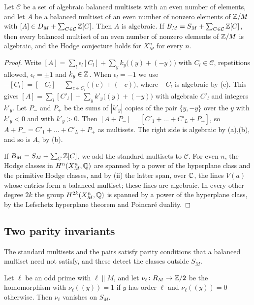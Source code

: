 \begin{lemma}\label{lem:transfer}
Let $\mathcal C$ be a set of algebraic balanced multisets with an even number
of elements, and let $A$ be a balanced multiset of an even number of nonzero
elements of $\mathbb{Z}/M$ with $[A]\in D_{M}+\sum_{C\in\mathcal C}\mathbb{Z}[C]$. Then
$A$ is algebraic. If $B_{M}=S_{M}+\sum_{C\in\mathcal C}\mathbb{Z}[C]$, then every
balanced multiset of an even number of nonzero elements of $\mathbb{Z}/M$ is
algebraic, and the Hodge conjecture holds for $X^{n}_{M}$ for every $n$.
\end{lemma}

\begin{proof}
Write $[A]=\sum_{l}\epsilon_{l}[C_{l}]+\sum_{y}k_{y}\bigl((y)+(-y)\bigr)$
with $C_{l}\in\mathcal C$, repetitions allowed, $\epsilon_{l}=\pm1$ and
$k_{y}\in\mathbb{Z}$. When $\epsilon_{l}=-1$ we use
$-[C_{l}]=[-C_{l}]-\sum_{c\in C_{l}}\bigl((c)+(-c)\bigr)$, where $-C_{l}$ is
algebraic by (c). This gives
$[A]=\sum_{l}[C'_{l}]+\sum_{y}k'_{y}\bigl((y)+(-y)\bigr)$ with algebraic
$C'_{l}$ and integers $k'_{y}$. Let $P_{-}$ and $P_{+}$ be the sums of
$|k'_{y}|$ copies of the pair $\{y,-y\}$ over the $y$ with $k'_{y}<0$ and
with $k'_{y}>0$. Then $[A+P_{-}]=[C'_{1}+\dots+C'_{L}+P_{+}]$, so
$A+P_{-}=C'_{1}+\dots+C'_{L}+P_{+}$ as multisets. The right side is
algebraic by (a),(b), and so is $A$, by
(b).

If $B_{M}=S_{M}+\sum_{C}\mathbb{Z}[C]$, we add the standard multisets to $\mathcal
C$. For even $n$, the Hodge classes in $H^{n}(X^{n}_{M},\mathbb{Q})$ are spanned by a
power of the hyperplane class and the primitive Hodge classes, and by
(ii) the latter span, over $\mathbb{C}$, the lines $V(a)$
whose entries form a balanced multiset; these lines are algebraic. In every
other degree $2k$ the group $H^{2k}(X^{n}_{M},\mathbb{Q})$ is spanned by a power of
the hyperplane class, by the Lefschetz hyperplane theorem and Poincar\'e
duality.
\end{proof}

\subsection{Two parity invariants}
The standard multisets and the pairs satisfy parity conditions that a
balanced multiset need not satisfy, and these detect the classes outside
$S_{M}$.

\begin{lemma}\label{lem:nu}
Let $\ell$ be an odd prime with $\ell\parallel M$, and let $\nu_{\ell}\colon
R_{M}\to\mathbb{Z}/2$ be the homomorphism with $\nu_{\ell}((y))=1$ if $y$ has order
$\ell$ and $\nu_{\ell}((y))=0$ otherwise. Then $\nu_{\ell}$ vanishes on
$S_{M}$.
\end{lemma}

